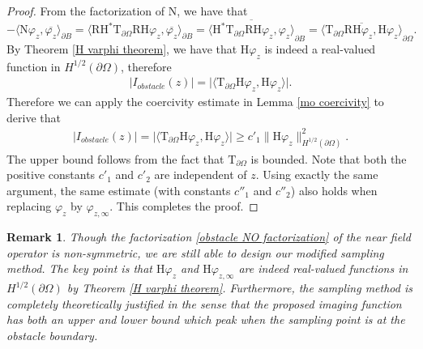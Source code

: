 \documentclass[final]{siamltex}
\newtheorem{remark}{Remark}
\begin{document}
\begin{proof}
From the factorization of $\mathrm{N}$, we have that
\begin{equation} \label{obstacle Iz proof eqn1}
- \langle   \mathrm{N} \varphi_z, \overline{\varphi_z} \rangle_{\partial B} =\langle   \mathrm{R} \mathrm{H}^* \mathrm{T}_{\partial \Omega}  \mathrm{R} \mathrm{H} \varphi_z, \overline{\varphi_z} \rangle_{\partial B} =\overline{ \langle \mathrm{H}^* \mathrm{T}_{\partial \Omega}   \mathrm{R} \mathrm{H} \varphi_z, \varphi_z \rangle}_{\partial B} =\overline{ \langle  \mathrm{T}_{\partial \Omega}  \mathrm{R} \mathrm{H} \varphi_z, \mathrm{H}\varphi_z \rangle}_{\partial \Omega} .
\end{equation}
By Theorem \ref{H varphi theorem}, we have that $\mathrm{H}\varphi_z$ is indeed a real-valued function in $H^{1/2}(\partial \Omega)$, therefore
\begin{eqnarray*}
\big| I_{obstacle}(z)\big| =  \big| \langle  \mathrm{T}_{\partial \Omega}   \mathrm{H} \varphi_z, \mathrm{H}\varphi_z \rangle \big|.
\end{eqnarray*}
Therefore we can apply the coercivity estimate in Lemma \ref{mo coercivity} to derive that
\begin{eqnarray*}
\big| I_{obstacle}(z)\big| =   \big| \langle  \mathrm{T}_{\partial \Omega}  \mathrm{H} \varphi_z, \mathrm{H}\varphi_z \rangle \big| \ge c'_1 \|  \mathrm{H} \varphi_z\|^2_{H^{1/2}(\partial \Omega)}.
\end{eqnarray*}
The upper bound follows from the fact that $\mathrm{T}_{\partial \Omega}$ is bounded. Note that both the positive constants $c'_1$ and $c'_2$ are independent of $z$. Using exactly the same argument, the same estimate (with  constants $c''_1$ and $c''_2$) also holds when replacing $\varphi_{z}$ by $\varphi_{z,\infty}$. This completes the proof.
\end{proof}

\begin{remark}
Though the factorization  \eqref{obstacle NO factorization} of the near field operator  is non-symmetric, we are still able to design our modified sampling method. The key point is that $\mathrm{H}\varphi_z$ and $\mathrm{H}\varphi_{z,\infty}$ are indeed real-valued functions in $H^{1/2}(\partial \Omega)$ by Theorem \ref{H varphi theorem}. Furthermore, the sampling method is completely theoretically justified in the sense that the proposed imaging function has both an upper and lower bound which peak when the sampling point is at the obstacle boundary.

\end{remark}
\end{document}
